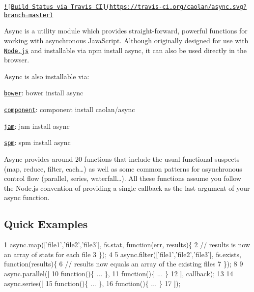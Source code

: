 \href{https://travis-ci.org/caolan/async}{\tt !\mbox{[}Build Status via Travis C\+I\mbox{]}(https\+://travis-\/ci.\+org/caolan/async.\+svg?branch=master)}

Async is a utility module which provides straight-\/forward, powerful functions for working with asynchronous Java\+Script. Although originally designed for use with \href{http://nodejs.org}{\tt Node.\+js} and installable via {\ttfamily npm install async}, it can also be used directly in the browser.

Async is also installable via\+:


\begin{DoxyItemize}
\item \href{http://bower.io/}{\tt bower}\+: {\ttfamily bower install async}
\item \href{https://github.com/component/component}{\tt component}\+: {\ttfamily component install caolan/async}
\item \href{http://jamjs.org/}{\tt jam}\+: {\ttfamily jam install async}
\item \href{http://spmjs.io/}{\tt spm}\+: {\ttfamily spm install async}
\end{DoxyItemize}

Async provides around 20 functions that include the usual \textquotesingle{}functional\textquotesingle{} suspects ({\ttfamily map}, {\ttfamily reduce}, {\ttfamily filter}, {\ttfamily each}…) as well as some common patterns for asynchronous control flow ({\ttfamily parallel}, {\ttfamily series}, {\ttfamily waterfall}…). All these functions assume you follow the Node.\+js convention of providing a single callback as the last argument of your {\ttfamily async} function.

\subsection*{Quick Examples}


\begin{DoxyCode}
1 async.map(['file1','file2','file3'], fs.stat, function(err, results)\{
2     // results is now an array of stats for each file
3 \});
4 
5 async.filter(['file1','file2','file3'], fs.exists, function(results)\{
6     // results now equals an array of the existing files
7 \});
8 
9 async.parallel([
10     function()\{ ... \},
11     function()\{ ... \}
12 ], callback);
13 
14 async.series([
15     function()\{ ... \},
16     function()\{ ... \}
17 ]);
\end{DoxyCode}


